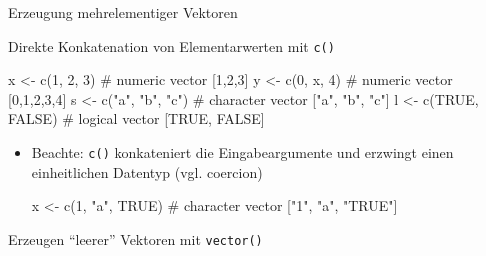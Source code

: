 \documentclass[
  8pt,
  ignorenonframetext,
]{beamer}
\newenvironment{Shaded}{\begin{snugshade}}{\end{snugshade}}
\newcommand{\CommentTok}[1]{\textcolor[rgb]{0.37,0.37,0.37}{#1}}
\newcommand{\ConstantTok}[1]{\textcolor[rgb]{0.56,0.35,0.01}{#1}}
\newcommand{\DecValTok}[1]{\textcolor[rgb]{0.68,0.00,0.00}{#1}}
\newcommand{\FunctionTok}[1]{\textcolor[rgb]{0.28,0.35,0.67}{#1}}
\newcommand{\NormalTok}[1]{\textcolor[rgb]{0.00,0.23,0.31}{#1}}
\newcommand{\OtherTok}[1]{\textcolor[rgb]{0.00,0.23,0.31}{#1}}
\newcommand{\StringTok}[1]{\textcolor[rgb]{0.13,0.47,0.30}{#1}}
\begin{document}
\begin{frame}[fragile]{Erzeugung mehrelementiger Vektoren}
\protect\hypertarget{erzeugung-mehrelementiger-vektoren}{}
\small

Direkte Konkatenation von Elementarwerten mit \texttt{c()}

\tiny

\begin{Shaded}
\begin{Highlighting}[]
\NormalTok{x }\OtherTok{\textless{}{-}} \FunctionTok{c}\NormalTok{(}\DecValTok{1}\NormalTok{, }\DecValTok{2}\NormalTok{, }\DecValTok{3}\NormalTok{)                    }\CommentTok{\# numeric vector [1,2,3]}
\NormalTok{y }\OtherTok{\textless{}{-}} \FunctionTok{c}\NormalTok{(}\DecValTok{0}\NormalTok{, x, }\DecValTok{4}\NormalTok{)                    }\CommentTok{\# numeric vector [0,1,2,3,4]}
\NormalTok{s }\OtherTok{\textless{}{-}} \FunctionTok{c}\NormalTok{(}\StringTok{"a"}\NormalTok{, }\StringTok{"b"}\NormalTok{, }\StringTok{"c"}\NormalTok{)              }\CommentTok{\# character vector ["a", "b", "c"]}
\NormalTok{l }\OtherTok{\textless{}{-}} \FunctionTok{c}\NormalTok{(}\ConstantTok{TRUE}\NormalTok{, }\ConstantTok{FALSE}\NormalTok{)                }\CommentTok{\# logical  vector [TRUE, FALSE]}
\end{Highlighting}
\end{Shaded}

\begin{itemize}
\item
  \footnotesize Beachte: \texttt{c()} konkateniert die Eingabeargumente
  und erzwingt einen einheitlichen Datentyp (vgl. coercion) \tiny

\begin{Shaded}
\begin{Highlighting}[]
\NormalTok{x }\OtherTok{\textless{}{-}} \FunctionTok{c}\NormalTok{(}\DecValTok{1}\NormalTok{, }\StringTok{"a"}\NormalTok{, }\ConstantTok{TRUE}\NormalTok{)         }\CommentTok{\# character vector ["1", "a", "TRUE"]}
\end{Highlighting}
\end{Shaded}
\end{itemize}

\small

Erzeugen ``leerer'' Vektoren mit \texttt{vector()}

\tiny


\end{frame}
\end{document}

